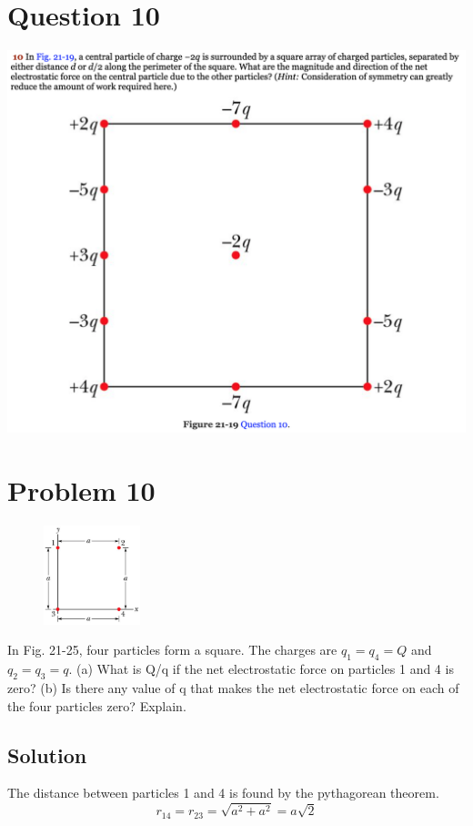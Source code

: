 \documentclass[12pt]{article}
\begin{document}
\section*{Question 10}
\includegraphics[width=\textwidth]{picture_3.png} 

\pagebreak
\section*{Problem 10}
\begin{figure}
    \vspace{-50pt}
    \includegraphics[width=0.25\textwidth,height=0.25\textwidth]{picture_4.png} 
\end{figure}
In Fig. 21-25, four particles form a square. The charges are $q_1 = q_4 = Q$ and $q_2 = q_3 = q$. (a) What is Q/q if the net electrostatic force on particles 1 and 4 is zero? (b) Is there any value of q that makes the net electrostatic force on each of the four particles zero? Explain.

\subsection*{Solution}
The distance between particles 1 and 4 is found by the pythagorean theorem.
\[r_{14} = r_{23} = \sqrt{a^2 + a^2} = a\sqrt{2}\]
\end{document}
